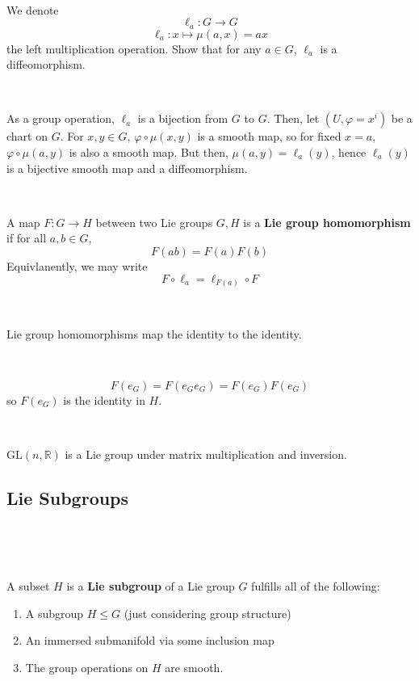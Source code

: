 \documentclass{article}
\begin{document}
\begin{exercise}
  \

  We denote $$\ell_a: G \to G$$$$\ell_a: x \mapsto \mu(a,x) = ax$$the left multiplication operation. Show that for any $a \in G$, $\ell_a$ is a diffeomorphism.
\end{exercise}

\begin{customproof}
  \

  As a group operation, $\ell_a$ is a bijection from $G$ to $G$. Then, let $(U, \varphi = x^i)$ be a chart on $G$. For $x,y \in G$, $\varphi \circ \mu(x,y)$ is a smooth map, so for fixed $x = a$, $\varphi \circ \mu(a,y)$ is also a smooth map. But then, $\mu(a,y) = \ell_a(y)$, hence $\ell_a(y)$ is a bijective smooth map and a diffeomorphism.
\end{customproof}

\begin{definition}
  \

  A map $F: G \to H$ between two Lie groups $G, H$ is a \textbf{Lie group homomorphism} if for all $a,b \in G$, $$F(ab) = F(a)F(b)$$Equivlanently, we may write $$F \circ \ell_a = \ell_{F(a)} \circ F$$
\end{definition}

\begin{proposition}
  \

  Lie group homomorphisms map the identity to the identity.
\end{proposition}

\begin{customproof}
  \

  $$F(e_G) = F(e_Ge_G) = F(e_G)F(e_G)$$so $F(e_G)$ is the identity in $H$.
\end{customproof}

\begin{example}
  \

  $\text{GL}(n, \mathbb{R})$ is a Lie group under matrix multiplication and inversion.
\end{example}

\subsection{Lie Subgroups}
\

\begin{definition}
  \

  A subset $H$ is a \textbf{Lie subgroup} of a Lie group $G$ fulfills all of the following:

  \begin{enumerate}
    \item A subgroup $H \leq G$ (just considering group structure)
    \item An immersed submanifold via some inclusion map
    \item The group operations on $H$ are smooth.
  \end{enumerate}
\end{definition}
\end{document}
